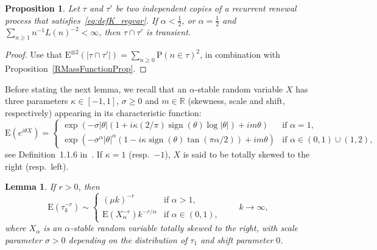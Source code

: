 \documentclass[11pt]{article}
\newtheorem{lemm}[theo]{Lemma}
\newtheorem{prop}[theo]{Proposition}
\theoremstyle{definition}
\numberwithin{equation}{section}
\numberwithin{figure}{section}
\numberwithin{table}{section}
\DeclareMathOperator{\sign}{sign}
\newcommand{\bbR}{{\ensuremath{\mathbb R}}}
\newcommand{\ga}{\alpha}
\newcommand{\gs}{\sigma}
\newcommand\bP{\ensuremath{\mathrm{P}}}
\newcommand\bE{\ensuremath{\mathrm{E}}}
\begin{document}
\begin{prop}\label{pr:transient.inter}
Let $\tau$ and $\tau'$ be two independent copies of a recurrent renewal process that satisfies~\eqref{eq:defK_regvar}. If $\ga < \frac{1}{2}$, or $\ga = \frac{1}{2}$ and $\sum_{n\geq1} n^{-1} L(n)^{-2} < \infty$, then $\tau \cap \tau'$ is transient.
\end{prop}

\begin{proof}
Use that $\bE^{\otimes 2}(|\tau \cap \tau'|) = \sum_{n\geq0} \bP(n \in \tau)^2$, in combination with Prop\-os\-ition~\ref{RMassFunctionProp}.
\end{proof}

Before stating the next lemma, we recall that an $\ga$-stable random variable $X$ has three parameters $\kappa\in[-1,1]$, $\sigma\ge 0$ and $m\in \bbR$ (skewness, scale and shift, respectively) appearing in its characteristic function:
\begin{equation} \label{eq:stable.cf}
\bE(e^{i\theta X}) =
\begin{cases}
\exp(-\sigma |\theta| (1 + i\kappa (2/\pi) \sign(\theta) \log|\theta|) + im\theta) & \text{if }\ga = 1,\\[4pt]
\exp(-\sigma^\ga |\theta|^\ga (1 - i\kappa \sign(\theta) \tan(\pi \ga /2)) + im\theta) & \text{if } \ga\in(0, 1)\cup(1,2),
\end{cases}
\end{equation} see Definition~1.1.6 in~\cite{ST94}. If $\kappa =1$ (resp.\ $-1$), $X$ is said to be totally skewed to the right (resp.\ left).

\begin{lemm}\label{lem:conv.power.tauk}
If $r > 0$, then
\begin{equation}
\bE(\tau_k^{- r}) \sim
\begin{cases}
(\mu k)^{- r} & \text{if } \ga > 1,\\[4pt]
\bE(X_\ga^{- r}) k^{- r/\ga} & \text{if } \ga \in (0,1),
\end{cases}
\qquad k \to \infty,
\end{equation}
where $X_\ga$ is an $\ga$-stable random variable totally skewed to the right, with scale parameter $\gs > 0$ depending on the distribution of $\tau_1$ and shift parameter $0$.
\end{lemm}
\end{document}
